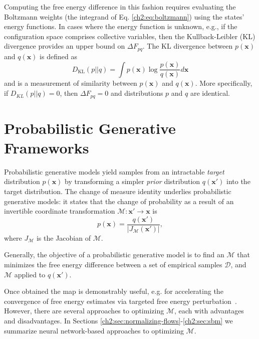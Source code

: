 Computing the free energy difference in this fashion requires evaluating the Boltzmann weights (the integrand of Eq. \ref{ch2:eq:boltzmann}) using the states' energy functions. In cases where the energy function is unknown, e.g., if the configuration space comprises collective variables, then the Kullback-Leibler (KL) divergence provides an upper bound on $\Delta F_{pq}$\cite{tfep-2021,lrex-2022}. The KL divergence between $p(\mathbf{x})$ and $q(\mathbf{x})$ is defined as
\begin{equation} 
\label{ch2:eq:KLD} 
D_{\mathrm{KL}}(p||q) = \int p(\mathbf{x}) \log \frac{p(\mathbf{x})}{q(\mathbf{x})} d\mathbf{x}
\end{equation} 
and is a measurement of similarity between $p(\mathbf{x})$ and $q(\mathbf{x})$. More specifically, if $D_{KL}(p||q)=0$, then $\Delta F_{pq}=0$ and distributions $p$ and $q$ are identical.

\section{Probabilistic Generative Frameworks}
\label{ch2:sec:gen-frameworks}

Probabilistic generative models yield samples from an intractable {\it target} distribution $p(\mathbf{x})$ by transforming a simpler {\it prior} distribution $q(\mathbf{x}')$ into the target distribution. The change of measure identity underlies probabilistic generative models: it states that the change of probability as a result of an invertible coordinate transformation $\mathcal{M}: \mathbf{x}' \rightarrow \mathbf{x}$ is
\begin{equation}
    \label{ch2:eq:change-of-measure}
    p(\mathbf{x}) = \frac{q(\mathbf{x}')}{|J_\mathcal{M}(\mathbf{x}')|},
\end{equation}
where $J_\mathcal{M}$ is the Jacobian of $\mathcal{M}$. 

Generally, the objective of a probabilistic generative model is to find an $\mathcal{M}$ that minimizes the free energy difference between a set of empirical samples $\mathcal{D}$, and $\mathcal{M}$ applied to $q(\mathbf{x}')$. 

Once obtained the map is demonstrably useful, e.g. for accelerating the convergence of free energy estimates via targeted free energy perturbation~\cite{TFEP,bijective-maps-2009,Noe2019Boltzmann,tfep-2020,tfep-2021,lrex-2022,herron2024inferring}. However, there are several approaches to optimizing $\mathcal{M}$, each with advantages and disadvantages. In Sections \ref{ch2:sec:normalizing-flows}-\ref{ch2:sec:sbm} we summarize neural network-based approaches to optimizing $\mathcal{M}$.


